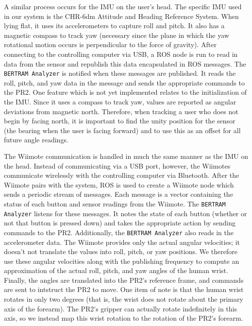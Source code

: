 \documentclass{sig-alternate}
\begin{document}
A similar process occurs for the IMU on the user's head. The specific IMU used in our system is
the CHR-6dm Attitude and Heading Reference System. When lying flat, it uses its
accelerometers to capture roll and pitch. It also has a magnetic compass to 
track yaw (necessary since the plane in which the yaw rotational motion occurs
is perpendicular to the force of gravity). After connecting to the 
controlling computer via 
USB, a ROS node is run to read in data from the sensor and republish this data
encapsulated in ROS messages. The {\tt BERTRAM Analyzer} is notified when these
messages are published. It reads the roll, pitch, and yaw data in the message
and sends the appropriate commands to the PR2. One feature which is not yet
implemented relates to the initialization of the IMU. Since it uses a compass
to track yaw, values are reported as angular deviations from magnetic north.
Therefore, when tracking a user who does not begin by facing north, it is 
important to find the unity position for the sensor (the bearing when 
the user is facing forward) and to use this as an offset for all future angle
readings.

The Wiimote communication is handled in much the same manner as the IMU on the head.
Instead of communicating via a USB port, however, the Wiimotes communicate wirelessly with the
controlling computer via Bluetooth. After the Wiimote pairs with the system,
ROS is used to create a Wiimote node which 
sends a periodic stream of messages. Each message is a vector containing the
status of each button and sensor readings from the Wiimote. The {\tt BERTRAM Analyzer}
listens for these messages. It notes the state of each button (whether or not that button
is pressed down)
and takes the appropriate action by sending commands to the PR2. Additionally, 
the {\tt BERTRAM Analyzer} also reads in the accelerometer data. The Wiimote
provides only the actual angular velocities; it doesn't not translate the 
values into roll, pitch, or yaw positions. We therefore use these angular velocities along 
with the publishing frequency to compute an approximation of the actual roll, pitch,
and yaw angles of the human wrist. Finally, the angles are translated into the PR2's
reference frame, and commands are sent to intstruct the PR2 to move. One 
item of note is that the human wrist rotates in only two degrees (that is,
the wrist does not rotate about the primary axis of the forearm). The PR2's 
gripper can actually rotate indefinitely in this axis, so we instead map this wrist rotation 
to the rotation of the PR2's forearm.
\end{document}
